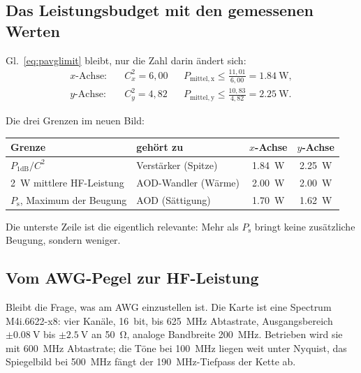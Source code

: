 \documentclass[11pt,a4paper]{article}
\newcommand{\crest}{\ensuremath{C}}
\begin{document}
\subsection{Das Leistungsbudget mit den gemessenen Werten}\label{sec:budgetmess}

Gl.~\eqref{eq:pavglimit} bleibt, nur die Zahl darin ändert sich:
\begin{align}
  \text{$x$-Achse:}\quad &\crest_x^2 = 6{,}00
  &&P_\mathrm{mittel,x} \le \frac{11{,}01}{6{,}00} = \SI{1.84}{\watt},\\
  \text{$y$-Achse:}\quad &\crest_y^2 = 4{,}82
  &&P_\mathrm{mittel,y} \le \frac{10{,}83}{4{,}82} = \SI{2.25}{\watt}.
\end{align}

\medskip
\noindent{}
\medskip

\noindent Die drei Grenzen im neuen Bild:
\begin{center}
\begin{tabular}{@{}llcc@{}}
  \toprule
  Grenze & gehört zu & $x$-Achse & $y$-Achse\\
  \midrule
  $P_{1\mathrm{dB}}/\crest^2$ & Verstärker (Spitze) & \SI{1.84}{\watt} & \SI{2.25}{\watt}\\
  \SI{2}{\watt} mittlere HF-Leistung & AOD-Wandler (Wärme) & \SI{2.00}{\watt} & \SI{2.00}{\watt}\\
  $P_\mathrm{s}$, Maximum der Beugung & AOD (Sättigung) & \SI{1.70}{\watt} & \SI{1.62}{\watt}\\
  \bottomrule
\end{tabular}
\end{center}
Die unterste Zeile ist die eigentlich relevante: Mehr als $P_\mathrm{s}$
bringt keine zusätzliche Beugung, sondern weniger.

\subsection{Vom AWG-Pegel zur HF-Leistung}\label{sec:awgpegel}

Bleibt die Frage, was am AWG einzustellen ist. Die Karte ist eine Spectrum
M4i.6622-x8: vier Kanäle, \SI{16}{bit}, bis \SI{625}{\mega\hertz} Abtastrate,
Ausgangsbereich $\pm\SI{0.08}{\volt}$ bis $\pm\SI{2.5}{\volt}$ an \SI{50}{\ohm},
analoge Bandbreite \SI{200}{\mega\hertz}. Betrieben wird sie mit
\SI{600}{\mega\hertz} Abtastrate; die Töne bei \SI{100}{\mega\hertz} liegen weit
unter Nyquist, das Spiegelbild bei \SI{500}{\mega\hertz} fängt der
\SI{190}{\mega\hertz}-Tiefpass der Kette ab.
\end{document}
